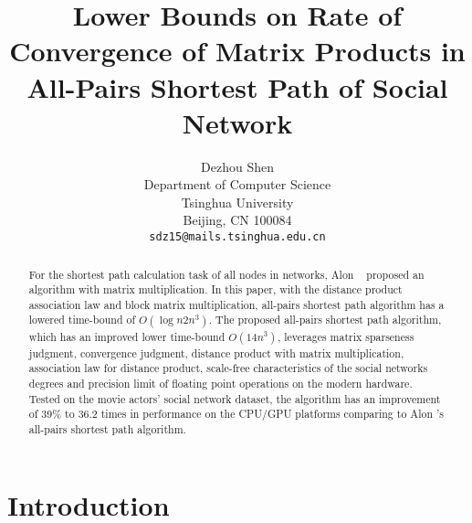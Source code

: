 \documentclass[review]{cvpr}
\begin{document}
\title{Lower Bounds on Rate of Convergence of Matrix Products in All-Pairs Shortest Path of Social Network}

\author{Dezhou Shen\\
Department of Computer Science\\
Tsinghua University\\
Beijing, CN 100084\\
{\tt\small sdz15@mails.tsinghua.edu.cn}
}

\maketitle


\begin{abstract}
  For the shortest path calculation task of all nodes in networks, Alon \etal~\cite{alon1997exponent} proposed an algorithm with matrix multiplication.
  In this paper, with the distance product association law and block matrix multiplication, all-pairs shortest path algorithm has a lowered time-bound of \(O(\log{n}2n^3)\).
  The proposed all-pairs shortest path algorithm, which has an improved lower time-bound \(O(14n^3)\), leverages matrix sparseness judgment, convergence judgment, distance product with matrix multiplication, association law for distance product,
  scale-free characteristics of the social networks degrees and precision limit of floating point operations on the modern hardware.
  Tested on the movie actors' social network dataset, the algorithm has an improvement of 39\% to 36.2 times in performance on the CPU/GPU platforms comparing to Alon \etal's all-pairs shortest path algorithm.
\end{abstract}

\section{Introduction}
\end{document}

